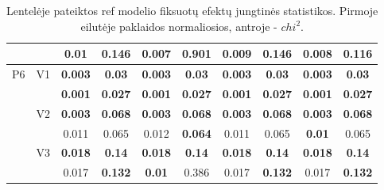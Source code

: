 \documentclass[12pt,a4paper]{article}
\begin{document}
\begin{sidewaystable}[ht]
{\begin{tabular}{cc|cc|cc|cc|cc|}
   &  & 0.01 & 0.146 & \textbf{0.007} & 0.901 & 0.009 & 0.146 & 0.008 & \textbf{0.116} \\ 
   \hline \hline\multirow{6}{*}{P6} & \multirow{2}{*}{V1} & \textbf{0.003} & \textbf{0.03} & \textbf{0.003} & \textbf{0.03} & \textbf{0.003} & \textbf{0.03} & \textbf{0.003} & \textbf{0.03} \\ 
   &  & \textbf{0.001} & \textbf{0.027} & \textbf{0.001} & \textbf{0.027} & \textbf{0.001} & \textbf{0.027} & \textbf{0.001} & \textbf{0.027} \\ 
   & \multirow{2}{*}{V2} & \textbf{0.003} & \textbf{0.068} & \textbf{0.003} & \textbf{0.068} & \textbf{0.003} & \textbf{0.068} & \textbf{0.003} & \textbf{0.068} \\ 
   &  & 0.011 & 0.065 & 0.012 & \textbf{0.064} & 0.011 & 0.065 & \textbf{0.01} & 0.065 \\ 
   & \multirow{2}{*}{V3} & \textbf{0.018} & \textbf{0.14} & \textbf{0.018} & \textbf{0.14} & \textbf{0.018} & \textbf{0.14} & \textbf{0.018} & \textbf{0.14} \\ 
   &  & 0.017 & \textbf{0.132} & \textbf{0.01} & 0.386 & 0.017 & \textbf{0.132} & 0.017 & \textbf{0.132} \\ 
   \hline
\end{tabular}
}
\caption{Lentelėje pateiktos ref modelio fiksuotų efektų jungtinės statistikos. Pirmoje eilutėje paklaidos normaliosios, antroje - $chi^2$.}
\end{sidewaystable}
\end{document}
